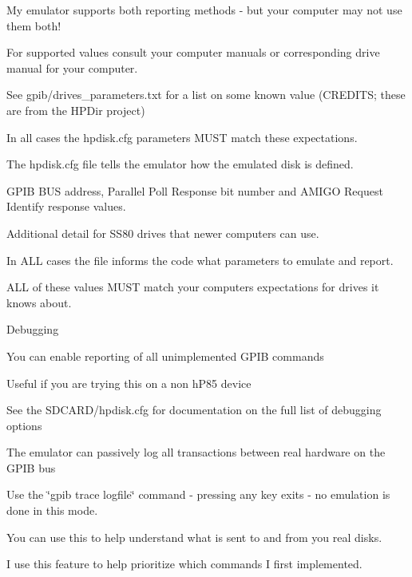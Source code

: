 \begin{DoxyItemize}
\begin{DoxyItemize}
\item My emulator supports both reporting methods -\/ but your computer may not use them both!
\begin{DoxyItemize}
\item For supported values consult your computer manuals or corresponding drive manual for your computer.
\begin{DoxyItemize}
\item See gpib/drives\+\_\+parameters.\+txt for a list on some known value (C\+R\+E\+D\+I\+TS; these are from the H\+P\+Dir project)
\end{DoxyItemize}
\item In all cases the hpdisk.\+cfg parameters M\+U\+ST match these expectations.
\end{DoxyItemize}
\item The hpdisk.\+cfg file tells the emulator how the emulated disk is defined.
\begin{DoxyItemize}
\item G\+P\+IB B\+US address, Parallel Poll Response bit number and A\+M\+I\+GO Request Identify response values.
\item Additional detail for S\+S80 drives that newer computers can use.
\item In A\+LL cases the file informs the code what parameters to emulate and report.
\begin{DoxyItemize}
\item A\+LL of these values M\+U\+ST match your computers expectations for drives it knows about.
\end{DoxyItemize}
\end{DoxyItemize}
\item Debugging
\begin{DoxyItemize}
\item You can enable reporting of all unimplemented G\+P\+IB commands
\begin{DoxyItemize}
\item Useful if you are trying this on a non h\+P85 device
\item See the S\+D\+C\+A\+R\+D/hpdisk.\+cfg for documentation on the full list of debugging options
\end{DoxyItemize}
\item The emulator can passively log all transactions between real hardware on the G\+P\+IB bus
\begin{DoxyItemize}
\item Use the \char`\"{}gpib trace logfile\char`\"{} command -\/ pressing any key exits -\/ no emulation is done in this mode.
\item You can use this to help understand what is sent to and from you real disks.
\item I use this feature to help prioritize which commands I first implemented. 


\end{DoxyItemize}
\end{DoxyItemize}
\end{DoxyItemize}
\end{DoxyItemize}

